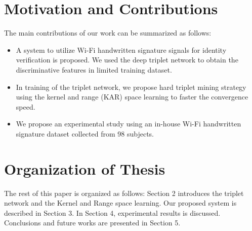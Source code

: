 \newpage
\section{Motivation and Contributions}
The main contributions of our work can be summarized as follows:
\begin{itemize}
\item A system to utilize Wi-Fi handwritten signature signals for identity verification is proposed. We used the deep triplet network to obtain the discriminative features in limited training dataset.
\item In training of the triplet network, we propose hard triplet mining strategy using the kernel and range (KAR) space learning to faster the convergence speed.
\item We propose an experimental study using an in-house Wi-Fi handwritten signature dataset collected from 98 subjects.
\end{itemize}

\section{Organization of Thesis}
The rest of this paper is organized as follows: Section 2 introduces the triplet network and the Kernel and Range space learning. Our proposed system is described in Section 3. In Section 4, experimental results is discussed. Conclusions and future works  are presented in Section 5. 
